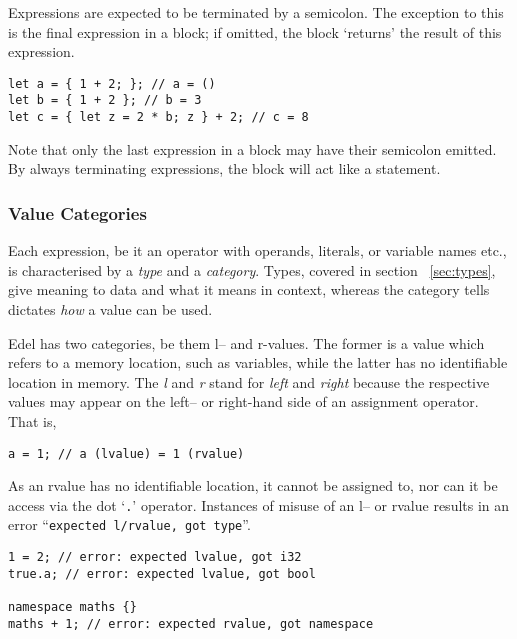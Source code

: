 \documentclass{article}
\begin{document}
    Expressions are expected to be terminated by a semicolon.
    The exception to this is the final expression in a block; if omitted, the block `returns' the result of this expression.

    \begin{lstlisting}[language=CustomLang]
let a = { 1 + 2; }; // a = ()
let b = { 1 + 2 }; // b = 3
let c = { let z = 2 * b; z } + 2; // c = 8
    \end{lstlisting}

    Note that only the last expression in a block may have their semicolon emitted.
    By always terminating expressions, the block will act like a statement.

    \subsubsection{Value Categories}

    Each expression, be it an operator with operands, literals, or variable names etc., is characterised by a \textit{type} and a \textit{category}.
    Types, covered in section ~\ref{sec:types}, give meaning to data and what it means in context, whereas the category tells dictates \textit{how} a value can be used.

    Edel has two categories, be them l-- and r-values.
    The former is a value which refers to a memory location, such as variables, while the latter has no identifiable location in memory.
    The \textit{l} and \textit{r} stand for \textit{left} and \textit{right} because the respective values may appear on the left-- or right-hand side of an assignment operator.
    That is,

    \begin{lstlisting}[language=CustomLang]
a = 1; // a (lvalue) = 1 (rvalue)
    \end{lstlisting}

    As an rvalue has no identifiable location, it cannot be assigned to, nor can it be access via the dot `\texttt{.}' operator.
    Instances of misuse of an l-- or rvalue results in an error ``\texttt{expected l/rvalue, got type}''.

    \begin{lstlisting}[language=CustomLang]
1 = 2; // error: expected lvalue, got i32
true.a; // error: expected lvalue, got bool

namespace maths {}
maths + 1; // error: expected rvalue, got namespace
    \end{lstlisting}
\end{document}
